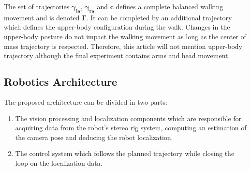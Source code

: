 The set of trajectories $\mathbf{\gamma_{\text{la}}}$, $\mathbf{\gamma_{\text{ra}}}$ and $\mathbf{c}$ defines a complete balanced walking movement and is denoted $\mathbf{\Gamma}$. It can be completed by an additional trajectory which defines the upper-body configuration during the walk. Changes in the upper-body posture do not impact the walking movement as long as the center of mass trajectory is respected. Therefore, this article will not mention upper-body trajectory although the final experiment contains arms and head movement.

\subsection{Robotics Architecture}

The proposed architecture can be divided in two parts:
\begin{enumerate}
\item The vision processing and localization components which are responsible for acquiring data from the robot's stereo rig system, computing an estimation of the camera pose and deducing the robot localization.
\item The control system which follows the planned trajectory while closing the loop on the localization data.
\end{enumerate}

